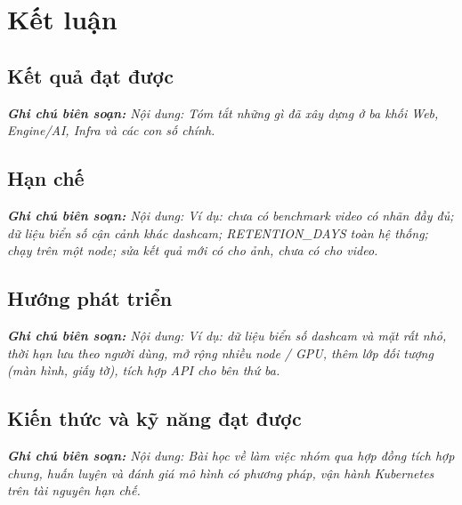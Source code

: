 \documentclass[a4paper,12pt]{article}
\begin{document}
\clearpage
\section*{Kết luận}


\subsection*{Kết quả đạt được}

{\small\itshape\noindent\textbf{Ghi chú biên soạn:} Nội dung: Tóm tắt những gì đã xây dựng ở ba khối Web, Engine/AI, Infra và các con số chính.\par\vspace{6pt}}


\subsection*{Hạn chế}

{\small\itshape\noindent\textbf{Ghi chú biên soạn:} Nội dung: Ví dụ: chưa có benchmark video có nhãn đầy đủ; dữ liệu biển số cận cảnh khác dashcam; RETENTION\_DAYS toàn hệ thống; chạy trên một node; sửa kết quả mới có cho ảnh, chưa có cho video.\par\vspace{6pt}}


\subsection*{Hướng phát triển}

{\small\itshape\noindent\textbf{Ghi chú biên soạn:} Nội dung: Ví dụ: dữ liệu biển số dashcam và mặt rất nhỏ, thời hạn lưu theo người dùng, mở rộng nhiều node / GPU, thêm lớp đối tượng (màn hình, giấy tờ), tích hợp API cho bên thứ ba.\par\vspace{6pt}}


\subsection*{Kiến thức và kỹ năng đạt được}

{\small\itshape\noindent\textbf{Ghi chú biên soạn:} Nội dung: Bài học về làm việc nhóm qua hợp đồng tích hợp chung, huấn luyện và đánh giá mô hình có phương pháp, vận hành Kubernetes trên tài nguyên hạn chế.\par\vspace{6pt}}
\end{document}
